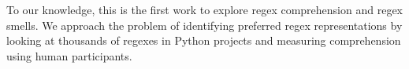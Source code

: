To our knowledge, this is the first work to explore regex comprehension and regex smells. We approach the problem of identifying preferred regex representations by looking at thousands of regexes in Python projects and measuring comprehension using human participants.  %
%
